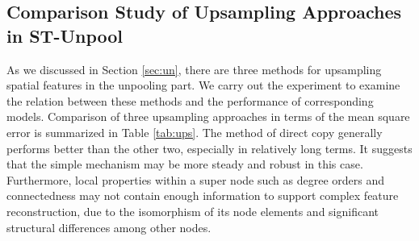 \documentclass[sigconf,screen]{acmart}
\begin{document}
\subsection{\label{sec:up}Comparison Study of Upsampling Approaches in ST-Unpool}
As we discussed in Section \ref{sec:un}, there are three methods for upsampling spatial features in the unpooling part. We carry out the experiment to examine the relation between these methods and the performance of corresponding models. Comparison of three upsampling approaches in terms of the mean square error is summarized in Table \ref{tab:ups}. The method of direct copy generally performs better than the other two, especially in relatively long terms. It suggests that the simple mechanism may be more steady and robust in this case. Furthermore, local properties within a super node such as degree orders and connectedness may not contain enough information to support complex feature reconstruction, due to the isomorphism of its node elements and significant structural differences among other nodes.

\begin{table}
\centering
\caption{\label{tab:ups}Comparison of different upsampling approaches in ST-Unpool in terms of MSE on PeMS-M (The notion `' indicates that the test model may not converge eventually).}
\end{table}
\end{document}
